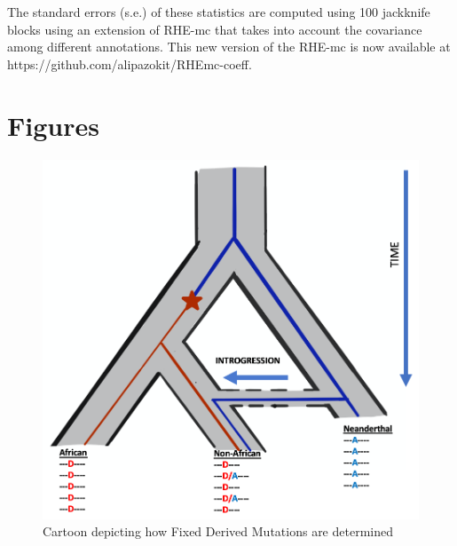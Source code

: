 The standard errors (s.e.) of these statistics are computed using 100 jackknife blocks using an extension of RHE-mc that takes into account the covariance among different annotations. This new version of the RHE-mc is now available at https://github.com/alipazokit/RHEmc-coeff.
\newpage
\FloatBarrier
\section{Figures}
\begin{figure}[htb]
    \centering
    \includegraphics[width=\textwidth]{chapter4/figures/fig4.1.png}
    \caption{Cartoon depicting how Fixed Derived Mutations are determined}
    \label{fig:4.1}
\end{figure}


